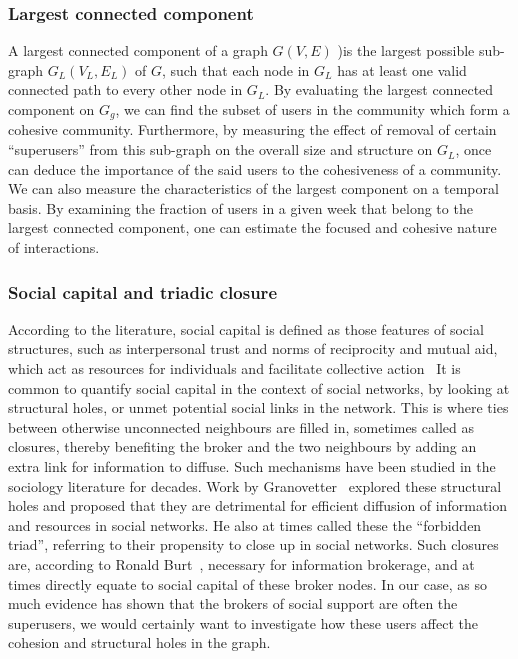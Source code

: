 \subsubsection{Largest connected component}
A largest connected component of a graph $G(V,E)$ )is the largest possible sub-graph $G_L(V_L,E_L)$ of $G$, such that each node in $G_L$ has at least one valid connected path to every other node in $G_L$. By evaluating the largest connected component on $G_g$, we can find the subset of users in the community which form a cohesive community. Furthermore, by measuring the effect of removal of certain ``superusers'' from this sub-graph on the overall size and structure on $G_L$, once can deduce the importance of the said users to the cohesiveness of a community. 
We can also measure the characteristics of the largest component on a temporal basis. By examining the fraction of users in a given week that belong to the largest connected component, one can estimate the focused and cohesive nature of interactions.


\subsubsection{Social capital and triadic closure} According to the literature, social capital is defined as those features of social structures, such as interpersonal trust and norms of reciprocity and mutual aid, which act as resources for individuals and facilitate collective action~\cite{collins1993social,coleman1988social}
It is common to quantify social capital in the context of social networks, by looking at structural holes, or unmet potential social links in the network. This is where ties between otherwise unconnected neighbours are filled in, sometimes called as closures, thereby benefiting the broker and the two neighbours by adding an extra link for information to diffuse. 
Such mechanisms have been studied in the sociology literature for decades. Work by Granovetter~\cite{granovetter1977strength} explored these structural holes and proposed that they are detrimental for efficient diffusion of information and resources in social networks. He also at times called these the ``forbidden triad'', referring to their propensity to close up in social networks. Such closures are, according to Ronald Burt~\cite{burt2004structural,burt2009structural}, necessary for information brokerage, and at times directly equate to social capital of these broker nodes.
In our case, as so much evidence has shown that the brokers of social support are often the superusers, we would certainly want to investigate how these users affect the cohesion and structural holes in the graph.


